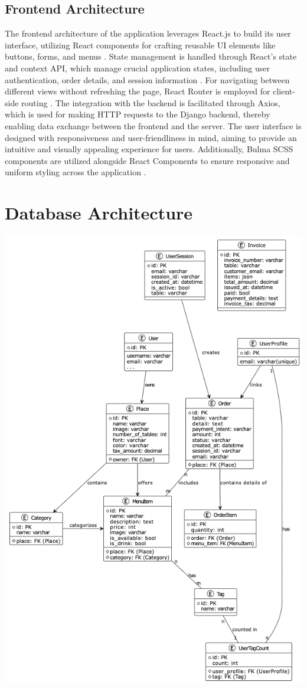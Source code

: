 \subsection{Frontend Architecture}
The frontend architecture of the application leverages React.js to build its user interface, utilizing React components for crafting reusable UI elements like buttons, forms, and menus \cite{15}. State management is handled through React's state and context API, which manage crucial application states, including user authentication, order details, and session information \cite{19}. For navigating between different views without refreshing the page, React Router is employed for client-side routing \cite{22}. The integration with the backend is facilitated through Axios, which is used for making HTTP requests to the Django backend, thereby enabling data exchange between the frontend and the server. The user interface is designed with responsiveness and user-friendliness in mind, aiming to provide an intuitive and visually appealing experience for users. Additionally, Bulma SCSS components are utilized alongside React Components to ensure responsive and uniform styling across the application \cite{22}.

\section{Database Architecture}
\includegraphics[width=1\textwidth]{images/databasediagram.png}


